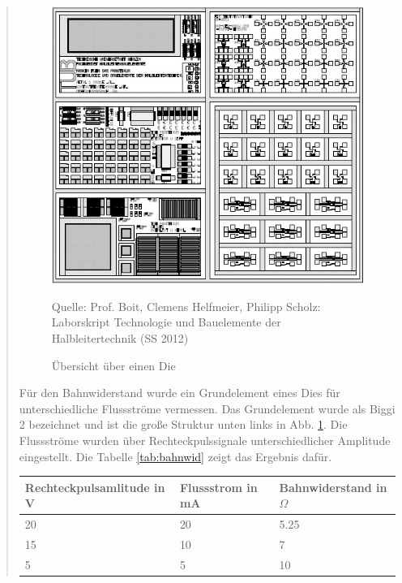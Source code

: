 \begin{quote}
    \begin{figure}[H]
        \centering
        \includegraphics[scale=0.8]{./SchaltverhaltenBilder/Die_uebersicht.jpg}
        \caption{Übersicht über einen Die}
             \begin{center}
                 \small Quelle: Prof. Boit, Clemens Helfmeier, Philipp Scholz: Laborskript Technologie und Bauelemente der Halbleitertechnik (SS 2012)
             \end{center}
        \label{fig:Die}
    \end{figure}

    \vspace{2em}


    Für den Bahnwiderstand wurde ein Grundelement eines Dies für
    unterschiedliche Flussströme vermessen. Das Grundelement wurde als Biggi 2
    bezeichnet und ist die große Struktur unten links in Abb. \ref{fig:Die}. Die
    Flussströme wurden über Rechteckpulssignale unterschiedlicher Amplitude
    eingestellt. Die Tabelle \ref{tab:bahnwid} zeigt das Ergebnis dafür.\\


    \vspace{2em}

            \begin{table}[H]
              \begin{addmargin}[3cm]{3cm}
                \centering
                   \begin{tabular}{|p{3cm}|p{3cm}|p{3cm}|}
                    \hline
                    Rechteckpulsamlitude in V & Flussstrom in mA &  Bahnwiderstand in $\Omega$\\
                    \hline
                    20 & 20 & 5.25 \\
                    \hline
                    15 & 10 & 7    \\
                    \hline
                    5 & 5 & 10     \\
                    \hline


\end{tabular}
\end{addmargin}
\end{table}
\end{quote}
